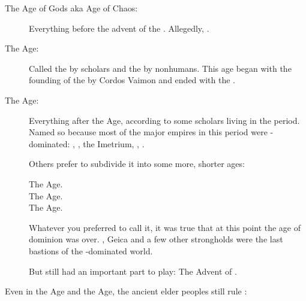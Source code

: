 \begin{description}
  \item[The Age of Gods aka Age of Chaos:]
    Everything before the advent of the \VaimonCaliphate. 
    Allegedly, .
  
  \item[The \Human Age:]
    Called the  by \human{} scholars and the  by nonhumans. 
    This age began with the founding of the \VaimonCaliphate by Cordos Vaimon and ended with the \Darkfall. 
  
  \item[The \Scatha Age:]
    Everything after the \Human{} Age, according to some \scathaese{} scholars living in the period. 
    Named so because most of the major empires in this period were \scatha-dominated:
    \Ortaica, \Durcac, the Imetrium, \Tepharae{}, \Velcad. 
    
    Others prefer to subdivide it into some more, shorter ages:
    
    \begin{description}
      \item[The \Ortaican Age.]
      \item[The \Tepharin Age.]
      \item[The \Velcadian Age.]
    \end{description}
    
    Whatever you preferred to call it, it was true that at this point the age of \human{} dominion was over. 
    \Redce, Geica and a few other strongholds were the last bastions of the \human-dominated world. 
    
    But \humanity{} still had an important part to play: 
    The Advent of . 
\end{description}

Even in the \Human Age and the \Scatha Age, the ancient elder peoples still rule \Miith:

